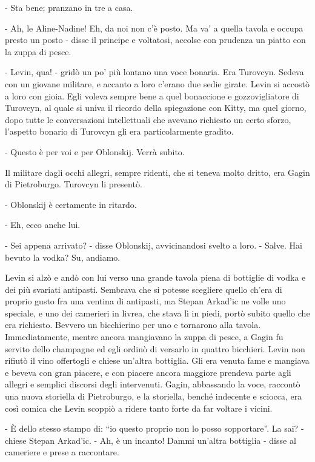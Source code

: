 - Sta bene; pranzano in tre a casa. 

- Ah, le Aline-Nadine! Eh, da noi non c'è posto. Ma va' a quella tavola e occupa presto un posto - disse il principe e voltatosi, accolse con prudenza un piatto con la zuppa di pesce. 

- Levin, qua! - gridò un po' più lontano una voce bonaria. Era Turovcyn. Sedeva con un giovane militare, e accanto a loro c'erano due sedie girate. Levin si accostò a loro con gioia. Egli voleva sempre bene a quel bonaccione e gozzovigliatore di Turovcyn, al quale si univa il ricordo della spiegazione con Kitty, ma quel giorno, dopo tutte le conversazioni intellettuali che avevano richiesto un certo sforzo, l'aspetto bonario di Turovcyn gli era particolarmente gradito. 

- Questo è per voi e per Oblonskij. Verrà subito. 

Il militare dagli occhi allegri, sempre ridenti, che si teneva molto dritto, era Gagin di Pietroburgo. Turovcyn li presentò. 

- Oblonskij è certamente in ritardo. 

- Eh, ecco anche lui. 

- Sei appena arrivato? - disse Oblonskij, avvicinandosi svelto a loro. - Salve. Hai bevuto la vodka? Su, andiamo. 

Levin si alzò e andò con lui verso una grande tavola piena di bottiglie di vodka e dei più svariati antipasti. Sembrava che si potesse scegliere quello ch'era di proprio gusto fra una ventina di antipasti, ma Stepan Arkad'ic ne volle uno speciale, e uno dei camerieri in livrea, che stava lì in piedi, portò subito quello che era richiesto. Bevvero un bicchierino per uno e tornarono alla tavola. Immediatamente, mentre ancora mangiavano la zuppa di pesce, a Gagin fu servito dello champagne ed egli ordinò di versarlo in quattro bicchieri. Levin non rifiutò il vino offertogli e chiese un'altra bottiglia. Gli era venuta fame e mangiava e beveva con gran piacere, e con piacere ancora maggiore prendeva parte agli allegri e semplici discorsi degli intervenuti. Gagin, abbassando la voce, raccontò una nuova storiella di Pietroburgo, e la storiella, benché indecente e sciocca, era così comica che Levin scoppiò a ridere tanto forte da far voltare i vicini. 

- È dello stesso stampo di: ``io questo proprio non lo posso sopportare''. La sai? - chiese Stepan Arkad'ic. - Ah, è un incanto! Dammi un'altra bottiglia - disse al cameriere e prese a raccontare. 

